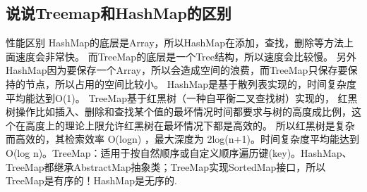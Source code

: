 \documentclass[../../../interview-questions.tex]{subfiles}
\begin{document}
\subsection{说说Treemap和HashMap的区别}

性能区别 HashMap的底层是Array，所以HashMap在添加，查找，删除等方法上面速度会非常快。 而TreeMap的底层是一个Tree结构，所以速度会比较慢。 另外HashMap因为要保存一个Array，所以会造成空间的浪费，而TreeMap只保存要保持的节点，所以占用的空间比较小。
HashMap是基于散列表实现的，时间复杂度平均能达到O(1)。 TreeMap基于红黑树（一种自平衡二叉查找树）实现的， 红黑树操作比如插入、删除和查找某个值的最坏情况时间都要求与树的高度成比例，这个在高度上的理论上限允许红黑树在最坏情况下都是高效的。 所以红黑树是复杂而高效的，其检索效率 O(logn) ，最大深度为 2log(n+1)。时间复杂度平均能达到O(log n)。TreeMap：适用于按自然顺序或自定义顺序遍历键(key)。HashMap、TreeMap都继承AbstractMap抽象类；TreeMap实现SortedMap接口，所以TreeMap是有序的！HashMap是无序的.
\end{document}
